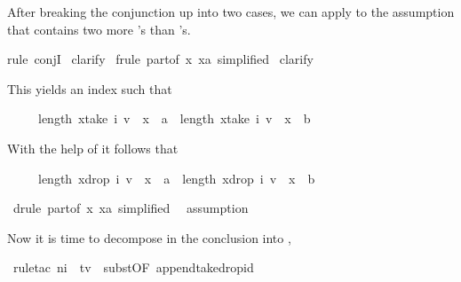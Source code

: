 \begin{isabellebody}
\begin{isamarkuptxt}
After breaking the conjunction up into two cases, we can apply
 to the assumption that  contains two more 's than 's.%
\end{isamarkuptxt}%
rule\ conjI{\isacharparenright}\isanewline
\ clarify{\isacharparenright}\isanewline
\ frule\ part{}{\isacharbrackleft}of\ {\isachardoublequote}{\isasymlambda}x{\isachardot}\ x{\isacharequal}a{\isachardoublequote}{\isacharcomma}\ simplified{\isacharbrackright}{\isacharparenright}\isanewline
\ clarify{\isacharparenright}%
\begin{isamarkuptxt}%
\noindent
This yields an index  such that
\begin{isabelle}%
\ \ \ \ \ length\ {\isacharbrackleft}x{\isasymin}take\ i\ v\ {\isachardot}\ x\ {\isacharequal}\ a{\isacharbrackright}\ {\isacharequal}\ length\ {\isacharbrackleft}x{\isasymin}take\ i\ v\ {\isachardot}\ x\ {\isacharequal}\ b{\isacharbrackright}\ {\isacharplus}\ {}%
\end{isabelle}
With the help of  it follows that
\begin{isabelle}%
\ \ \ \ \ length\ {\isacharbrackleft}x{\isasymin}drop\ i\ v\ {\isachardot}\ x\ {\isacharequal}\ a{\isacharbrackright}\ {\isacharequal}\ length\ {\isacharbrackleft}x{\isasymin}drop\ i\ v\ {\isachardot}\ x\ {\isacharequal}\ b{\isacharbrackright}\ {\isacharplus}\ {}%
\end{isabelle}%
\end{isamarkuptxt}%
\ drule\ part{}{\isacharbrackleft}of\ {\isachardoublequote}{\isasymlambda}x{\isachardot}\ x{\isacharequal}a{\isachardoublequote}{\isacharcomma}\ simplified{\isacharbrackright}{\isacharparenright}\isanewline
\ \ assumption{\isacharparenright}%
\begin{isamarkuptxt}%
\noindent
Now it is time to decompose  in the conclusion 
into ,%
\end{isamarkuptxt}%
\ rule{\isacharunderscore}tac\ n{}{\isacharequal}i\ \ t{\isacharequal}v\ \ subst{\isacharbrackleft}OF\ append{\isacharunderscore}take{\isacharunderscore}drop{\isacharunderscore}id{\isacharbrackright}{\isacharparenright}%

\end{isabellebody}

